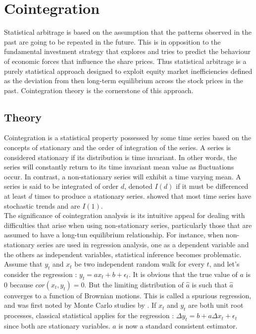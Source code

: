 \documentclass[11pt,a4,twosided,singlespacing,titlepagenumber=on]{scrreprt}
\numberwithin{equation}{chapter} %
\theoremstyle{remark}
\begin{document}
\chapter{Cointegration}

Statistical arbitrage is based on the assumption that the patterns observed in the past are going to be repeated in the future. This is in opposition to the fundamental investment strategy that explores and tries to predict the behaviour of economic forces that influence the share prices. Thus statistical arbitrage is a purely statistical approach designed to exploit equity market inefficiencies defined as the deviation from then long-term equilibrium across the stock prices in the past. Cointegration theory is the cornerstone of this approach. 

\section{Theory}
Cointegration is a statistical property possessed by some time series based on the concepts of stationary and the order of integration of the series. A series is considered stationary if its distribution is time invariant. In other words, the series will constantly return to its time invariant mean value as fluctuations occur. In contrast, a non-stationary series will exhibit a time varying mean. A series is said to be integrated of order $d$, denoted $I(d)$ if it must be differenced at least $d$ times to produce a stationary series.
\cite{nelson1982} showed that most time series have stochastic trends and are $I(1)$. \\


The significance of cointegration analysis is its intuitive appeal for dealing with difficulties that arise when using non-stationary series, particularly those that are assumed to have a long-tun equilibrium relationship. For instance, when non-stationary series are used in regression analysis, one as a dependent variable and the others as independent variables, statistical inference becomes problematic. Assume that $y_t$ and $x_t$ be two independent random walk for every $t$, and let's consider the regression : $y_t = a x_t + b + \epsilon_t$. It is obvious that the true value of $a$ is 0 because $cor(x_t, y_t) = 0$. But the limiting distribution of $\hat{a}$ is such that $\hat{a}$ converges to a function of Brownian motions. This is called a spurious regression, and was first noted by Monte Carlo studies by \cite{granger1974}. If $x_t$ and $y_t$ are both unit root processes, classical statistical applies for the regression : $\Delta y_t = b + a \Delta x_t + \epsilon_t$ since both are stationary variables. $\hat{a}$ is now a standard consistent estimator. \\
\end{document}
